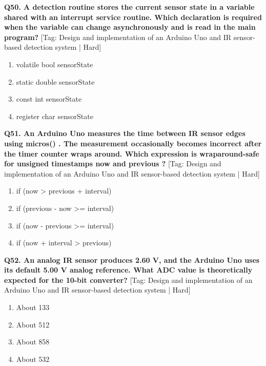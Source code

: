 \noindent\textbf{Q50. A detection routine stores the current sensor state in a variable shared with an interrupt service routine. Which declaration is required when the variable can change asynchronously and is read in the main program?} \hfill [Tag: Design and implementation of an Arduino Uno and IR sensor-based detection system | Hard]
\begin{enumerate}[label=(\alph*),topsep=2pt,itemsep=1pt,partopsep=0pt,parsep=0pt]
    \item {volatile bool sensorState}
    \item {static double sensorState}
    \item {const int sensorState}
    \item {register char sensorState}
\end{enumerate}
\vspace{2mm}

\noindent\textbf{Q51. An Arduino Uno measures the time between IR sensor edges using micros() . The measurement occasionally becomes incorrect after the timer counter wraps around. Which expression is wraparound-safe for unsigned timestamps now and previous ?} \hfill [Tag: Design and implementation of an Arduino Uno and IR sensor-based detection system | Hard]
\begin{enumerate}[label=(\alph*),topsep=2pt,itemsep=1pt,partopsep=0pt,parsep=0pt]
    \item {if (now > previous + interval)}
    \item {if (previous - now >= interval)}
    \item {if (now - previous >= interval)}
    \item {if (now + interval > previous)}
\end{enumerate}
\vspace{2mm}

\noindent\textbf{Q52. An analog IR sensor produces 2.60 V, and the Arduino Uno uses its default 5.00 V analog reference. What ADC value is theoretically expected for the 10-bit converter?} \hfill [Tag: Design and implementation of an Arduino Uno and IR sensor-based detection system | Hard]
\begin{enumerate}[label=(\alph*),topsep=2pt,itemsep=1pt,partopsep=0pt,parsep=0pt]
    \item {About 133}
    \item {About 512}
    \item {About 858}
    \item {About 532}
\end{enumerate}
\vspace{2mm}

